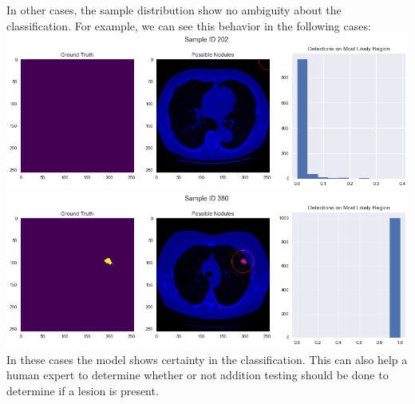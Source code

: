 \documentclass[12pt]{article}
\begin{document}
{In other cases, the sample distribution show no ambiguity about the classification. For example, we can see this behavior in the following cases: \\

\includegraphics[scale=0.5]{Certain_no_nodule.png} \\

\includegraphics[scale=0.5]{sure_there_is_nodule.png} \\

In these cases the model shows certainty in the classification. This can also help a human expert to determine whether or not addition testing should be done to determine if a lesion is present. 

}
\end{document}
